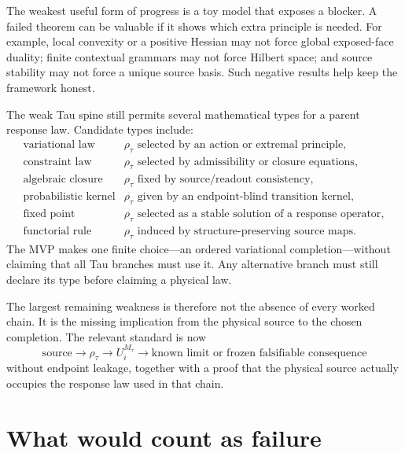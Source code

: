 \documentclass[11pt]{article}
\newcommand{\Rmap}{\rho_{\tau}}
\newcommand{\Mta}{M_{\tau}}
\begin{document}
The weakest useful form of progress is a toy model that exposes a blocker.  A
failed theorem can be valuable if it shows which extra principle is needed.
For example, local convexity or a positive Hessian may not force global
exposed-face duality; finite contextual grammars may not force Hilbert space;
and source stability may not force a unique source basis.  Such negative
results help keep the framework honest.

The weak Tau spine still permits several mathematical types for a parent
response law.  Candidate types include:
\[
\begin{array}{ll}
\text{variational law} & \Rmap \text{ selected by an action or extremal principle},\\
\text{constraint law} & \Rmap \text{ selected by admissibility or closure equations},\\
\text{algebraic closure} & \Rmap \text{ fixed by source/readout consistency},\\
\text{probabilistic kernel} & \Rmap \text{ given by an endpoint-blind transition kernel},\\
\text{fixed point} & \Rmap \text{ selected as a stable solution of a response operator},\\
\text{functorial rule} & \Rmap \text{ induced by structure-preserving source maps}.
\end{array}
\]
The MVP makes one finite choice---an ordered variational completion---without
claiming that all Tau branches must use it.  Any alternative branch must still
declare its type before claiming a physical law.

The largest remaining weakness is therefore not the absence of every worked
chain.  It is the missing implication from the physical source to the chosen
completion.  The relevant standard is now
\[
  \text{source}\to\Rmap\to U_i^{\Mta}
  \to \text{known limit or frozen falsifiable consequence}
\]
without endpoint leakage, together with a proof that the physical source
actually occupies the response law used in that chain.

\section{What would count as failure}
\end{document}
